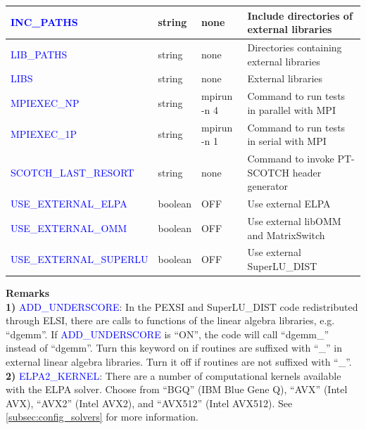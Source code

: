 \documentclass{report}
\begin{document}
\begin{tabular}[]{|p{50mm}|p{15mm}|p{20mm}|p{80mm}|}
\hline
\textcolor{blue}{INC\_PATHS}                 & string  & none        & Include directories of external libraries\\
\hline
\textcolor{blue}{LIB\_PATHS}                 & string  & none        & Directories containing external libraries\\
\hline
\textcolor{blue}{LIBS}                       & string  & none        & External libraries\\
\hline
\textcolor{blue}{MPIEXEC\_NP}                & string  & mpirun -n 4 & Command to run tests in parallel with MPI\\
\hline
\textcolor{blue}{MPIEXEC\_1P}                & string  & mpirun -n 1 & Command to run tests in serial with MPI\\
\hline
\textcolor{blue}{SCOTCH\_LAST\_RESORT}       & string  & none        & Command to invoke PT-SCOTCH header generator\\
\hline
\textcolor{blue}{USE\_EXTERNAL\_ELPA}        & boolean & OFF         & Use external ELPA\\
\hline
\textcolor{blue}{USE\_EXTERNAL\_OMM}         & boolean & OFF         & Use external libOMM and MatrixSwitch\\
\hline
\textcolor{blue}{USE\_EXTERNAL\_SUPERLU}     & boolean & OFF         & Use external SuperLU\_DIST\\
\hline
\end{tabular}

\bigskip
\textbf{Remarks}\\

\textbf{1)} \textcolor{blue}{ADD\_UNDERSCORE}:  In the PEXSI and SuperLU\_DIST code redistributed through ELSI, there are calls to functions of the linear algebra libraries, e.g. ``dgemm''.  If \textcolor{blue}{ADD\_UNDERSCORE} is ``ON'', the code will call ``dgemm\_'' instead of ``dgemm''.  Turn this keyword on if routines are suffixed with ``\_'' in external linear algebra libraries.  Turn it off if routines are not suffixed with ``\_''.\\

\textbf{2)} \textcolor{blue}{ELPA2\_KERNEL}:  There are a number of computational kernels available with the ELPA solver.  Choose from ``BGQ'' (IBM Blue Gene Q), ``AVX'' (Intel AVX), ``AVX2'' (Intel AVX2), and ``AVX512'' (Intel AVX512).  See \ref{subsec:config_solvers} for more information.\\
\end{document}
